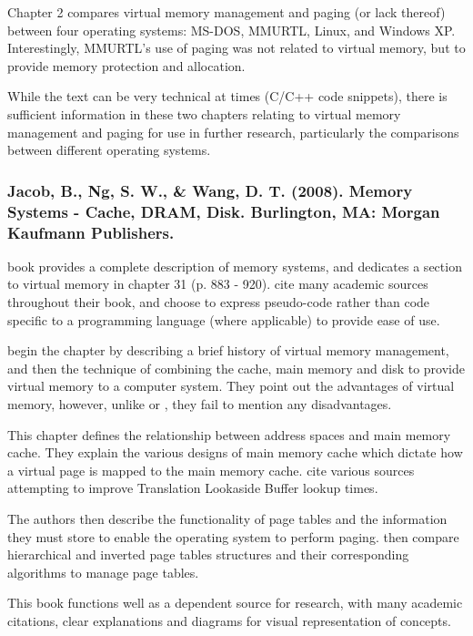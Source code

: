 Chapter 2 compares virtual memory management and paging (or lack thereof) between four operating systems: MS-DOS, MMURTL, Linux, and Windows XP. Interestingly, MMURTL's use of paging was not related to virtual memory, but to provide memory protection and allocation.

While the text can be very technical at times (C/C++ code snippets), there is sufficient information in these two chapters relating to virtual memory management and paging for use in further research, particularly the comparisons between different operating systems.

\subsubsection*{Jacob, B., Ng, S. W., \& Wang, D. T. (2008). Memory Systems - Cache, DRAM, Disk. Burlington, MA: Morgan Kaufmann Publishers.}

 book provides a complete description of memory systems, and dedicates a section to virtual memory in chapter 31 (p. 883 - 920). \citet{Jacob2008} cite many academic sources throughout their book, and choose to express pseudo-code rather than code specific to a programming language (where applicable) to provide ease of use.

\citet{Jacob2008} begin the chapter by describing a brief history of virtual memory management, and then the technique of combining the cache, main memory and disk to provide virtual memory to a computer system. They point out the advantages of virtual memory, however, unlike \citet{Blanchet2012} or \citet{Blunden2003}, they fail to mention any disadvantages.

This chapter defines the relationship between address spaces and main memory cache. They explain the various designs of main memory cache which dictate how a virtual page is mapped to the main memory cache. \citet{Jacob2008} cite various sources attempting to improve Translation Lookaside Buffer lookup times.

The authors then describe the functionality of page tables and the information they must store to enable the operating system to perform paging. \citet{Jacob2008} then compare hierarchical and inverted page tables structures and their corresponding algorithms to manage page tables.

This book functions well as a dependent source for research, with many academic citations, clear explanations and diagrams for visual representation of concepts.